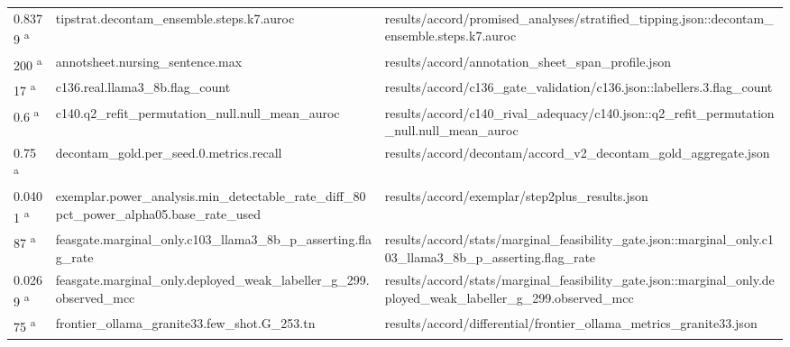 \begin{longtable}{@{}p{0.7in}p{1.9in}p{2.6in}@{}}
0.8379 \textsuperscript{a} & tipstrat.\allowbreak{}decontam\_ensemble.\allowbreak{}steps.\allowbreak{}k7.\allowbreak{}auroc & results/\allowbreak{}accord/\allowbreak{}promised\_analyses/\allowbreak{}stratified\_tipping.\allowbreak{}json::decontam\_ensemble.\allowbreak{}steps.\allowbreak{}k7.\allowbreak{}auroc\\
200 \textsuperscript{a} & annotsheet.\allowbreak{}nursing\_sentence.\allowbreak{}max & results/\allowbreak{}accord/\allowbreak{}annotation\_sheet\_span\_profile.\allowbreak{}json\\
17 \textsuperscript{a} & c136.\allowbreak{}real.\allowbreak{}llama3\_8b.\allowbreak{}flag\_count & results/\allowbreak{}accord/\allowbreak{}c136\_gate\_validation/\allowbreak{}c136.\allowbreak{}json::labellers.\allowbreak{}3.\allowbreak{}flag\_count\\
0.6 \textsuperscript{a} & c140.\allowbreak{}q2\_refit\_permutation\_null.\allowbreak{}null\_mean\_auroc & results/\allowbreak{}accord/\allowbreak{}c140\_rival\_adequacy/\allowbreak{}c140.\allowbreak{}json::q2\_refit\_permutation\_null.\allowbreak{}null\_mean\_auroc\\
0.75 \textsuperscript{a} & decontam\_gold.\allowbreak{}per\_seed.\allowbreak{}0.\allowbreak{}metrics.\allowbreak{}recall & results/\allowbreak{}accord/\allowbreak{}decontam/\allowbreak{}accord\_v2\_decontam\_gold\_aggregate.\allowbreak{}json\\
0.0401 \textsuperscript{a} & exemplar.\allowbreak{}power\_analysis.\allowbreak{}min\_detectable\_rate\_diff\_80pct\_power\_alpha05.\allowbreak{}base\_rate\_used & results/\allowbreak{}accord/\allowbreak{}exemplar/\allowbreak{}step2plus\_results.\allowbreak{}json\\
87 \textsuperscript{a} & feasgate.\allowbreak{}marginal\_only.\allowbreak{}c103\_llama3\_8b\_p\_asserting.\allowbreak{}flag\_rate & results/\allowbreak{}accord/\allowbreak{}stats/\allowbreak{}marginal\_feasibility\_gate.\allowbreak{}json::marginal\_only.\allowbreak{}c103\_llama3\_8b\_p\_asserting.\allowbreak{}flag\_rate\\
0.0269 \textsuperscript{a} & feasgate.\allowbreak{}marginal\_only.\allowbreak{}deployed\_weak\_labeller\_g\_299.\allowbreak{}observed\_mcc & results/\allowbreak{}accord/\allowbreak{}stats/\allowbreak{}marginal\_feasibility\_gate.\allowbreak{}json::marginal\_only.\allowbreak{}deployed\_weak\_labeller\_g\_299.\allowbreak{}observed\_mcc\\
75 \textsuperscript{a} & frontier\_ollama\_granite33.\allowbreak{}few\_shot.\allowbreak{}G\_253.\allowbreak{}tn & results/\allowbreak{}accord/\allowbreak{}differential/\allowbreak{}frontier\_ollama\_metrics\_granite33.\allowbreak{}json\\

\end{longtable}
